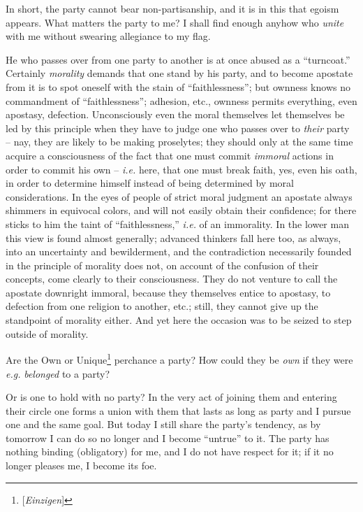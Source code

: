 In short, the party cannot bear non-partisanship, and it is in this that 
egoism appears. What matters the party to me? I shall find enough anyhow who 
\textit{unite} with me without swearing allegiance to my flag.

He who passes over from one party to another is at once abused as a 
``turncoat.'' Certainly \textit{morality} demands that one stand by his 
party, and to become apostate from it is to spot oneself with the stain of 
``faithlessness''; but ownness knows no commandment of ``faithlessness''; 
adhesion, etc., ownness permits everything, even apostasy, defection. 
Unconsciously even the moral themselves let themselves be led by this 
principle when they have to judge one who passes over to \textit{their} party 
-- nay, they are likely to be making proselytes; they should only at the same 
time acquire a consciousness of the fact that one must commit \textit{immoral} 
actions in order to commit his own -- \textit{i.e.} here, that one must break 
faith, yes, even his oath, in order to determine himself instead of being 
determined by moral considerations. In the eyes of people of strict moral 
judgment an apostate always shimmers in equivocal colors, and will not easily 
obtain their confidence; for there sticks to him the taint of 
``faithlessness,'' \textit{i.e.} of an immorality. In the lower man this 
view is found almost generally; advanced thinkers fall here too, as always, 
into an uncertainty and bewilderment, and the contradiction necessarily 
founded in the principle of morality does not, on account of the confusion of 
their concepts, come clearly to their consciousness. They do not venture to 
call the apostate downright immoral, because they themselves entice to 
apostasy, to defection from one religion to another, etc.; still, they cannot 
give up the standpoint of morality either. And yet here the occasion was to be 
seized to step outside of morality.

Are the Own or Unique\footnote{[\textit{Einzigen}]} perchance a party? How 
could they be \textit{own} if they were \textit{e.g.} \textit{belonged} to a 
party?

Or is one to hold with no party? In the very act of joining them and entering 
their circle one forms a union with them that lasts as long as party and I 
pursue one and the same goal. But today I still share the party's tendency, as 
by tomorrow I can do so no longer and I become ``untrue'' to it. The party 
has nothing binding (obligatory) for me, and I do not have respect for it; if 
it no longer pleases me, I become its foe.

